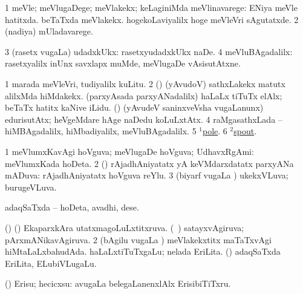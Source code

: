 \bentry 
{} 
\gl{\upa}
\bmng
\bnum
\num{1} meVle; meVlugaDege; meVlakekx; keLaginiMda meVlinavarege:  ENiya meVle hatitxda.  beTaTxda meVlakekx.  hogekoLaviyalilx hoge meVleVri sAgutatxde. 
\num{2} (nadiya) mUladavarege. 
\num{3} (rasetx \mo vugaLa) udadxkUkx:  rasetxyudadxkUkx naDe. 
\num{4} meVluBAgadalilx:  rasetxyalilx inUnx savxlapx muMde, meVlugaDe vAsisutAtxne. 
\enum
\emng

\noindent
\gl{\pagu}
\expl{}
\bmng
\bnum
\num{1}  marada meVleVri, tudiyalilx kuLitu. 
\num{2}  (\rUpa) (yAvudoV) sathxLakekx matutx alilxMda hiMdakekx. 
  
\banum
{} (parxyAsada parxyANadalilx) haLaLx tiTuTx elAlx; beTaTx hatitx kaNive iLidu. 
 (\rUpa) (yAvudeV saninxveVsha \mo vugaLanunx) edurisutAtx; heVgeMdare hAge naDedu koLuLxtAtx. 
\eanum
\numie
\num{4}  raMgasathxLada -- hiMBAgadalilx, hiMbadiyalilx, meVluBAgadalilx. 
\num{5}  \hyperref{kandict_p.pdf}{P}{pole(1) pagu(2)}{$^1$pole}. 
\num{6}  \hyperref{kandict_s.pdf}{S}{spout(2) pagu}{$^2$spout}. 
\enum
\emng
\eentry

\bentry
{} 
\gl{\gu}
\expl{}
\bmng
\bnum
\num{1} meVlumxKavAgi hoVguva; meVlugaDe hoVguva; UdhavxRgAmi:  meVlumxKada hoDeta. 
\num{2} (\birx) rAjadhAniyatatx yA keVMdarxdatatx parxyANa mADuva:  rAjadhAniyatatx hoVguva reYlu. 
\num{3} (biyarf \mo vugaLa \vi) ukekxVLuva; burugeVLuva. 
\enum
\emng
\eentry

\bentry
{} 
\gl{\nA}
\expl{}
\bmng
adaqSaTxda -- hoDeta, avadhi, dese. 
\emng

\noindent
\gl{\pagu}
\expl{}
\bmng
\bnum
{}  (\AmA) 
\banum
{} (\birx) EkaparxkAra utatxmagoLuLxtitxruva. 
 (\kanmu\ \ame) satayxvAgiruva; pArxmANikavAgiruva. 
\eanum
\numie
\num{2}  (bAgilu \mo vugaLa \vi) meVlakekxtitx maTaTxvAgi hiMtaLaLxbahudAda. 
  
\banum
{} haLaLxtiTuTxgaLu; nelada EriLita. 
 (\rUpa) adaqSaTxda EriLita, ELubiVLugaLu. 
\eanum
\numie
\enum
\emng
\eentry

\bentry
{} 
\gl{\kirx}


\noindent
\gl{\sakirx}
\expl{}
\bmng
(\AmA) Erisu; hecicxsu:  avugaLa belegaLanenxlAlx ErisibiTiTxru. 
\emng

